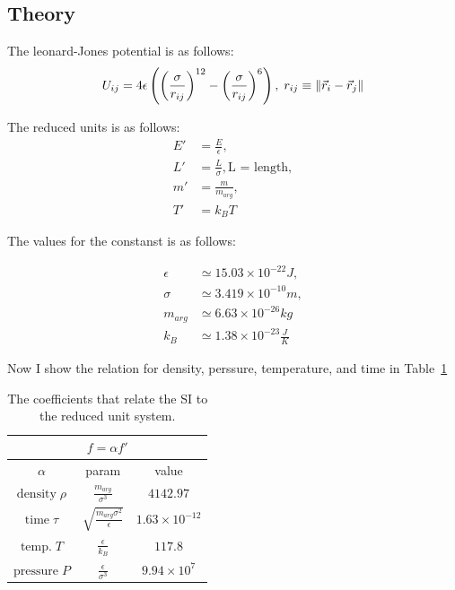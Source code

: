 \documentclass[12pt, a4paper]{article}
\begin{document}
	\subsection{Theory}
	The leonard-Jones potential is as follows:
		\begin{equation}
		U_{ij} = 4\epsilon \left(\left(\frac{\sigma}{r_{ij}}\right)^{12} - 
		\left(\frac{\sigma}{r_{ij}}\right)^6\right), \; 
		r_{ij} \equiv \norm{\vec{r}_i - \vec{r}_j}
		\label{eq:leonard_jones}
	\end{equation}
	
	The reduced units is as follows:
	\begin{equation}
		\begin{aligned}
			E' &= \frac{E}{\epsilon}, \\
			L' &= \frac{L}{\sigma}, \text{L = length},\\
			 m' &= \frac{m}{m_{arg}}, \\
			T' &= k_B T
		\end{aligned}
	\end{equation}

	\newpage
	The values for the constanst is as follows:
	
	\begin{equation}
		\begin{aligned}
			\epsilon &\simeq 15.03 \times 10^{-22} J,\\
			\sigma &\simeq 3.419 \times 10^{-10} m,\\
			m_{arg} &\simeq 6.63 \times 10^{-26} kg\\
			k_B &\simeq 1.38 \times 10^{-23} \frac{J}{K}
		\end{aligned}
	\end{equation}

	Now I show the relation for density, perssure, temperature, and time in Table~\ref{tab:reduced}
	
	\begin{table}[h!]
		\centering
		\begin{tabular}{|c|c|c|}
	\hline
\multicolumn{3}{|c|}{$f = \alpha f'$}\\
\hline
 $\alpha$ & param & value \\
 \hline
$\text{density} \;\rho$ & $\frac{m_{arg}}{\sigma^3}$ & $4142.97$\\
 \hline
 $\text{time}\; \tau$ & $\sqrt{\frac{m_{arg} \sigma^2}{\epsilon}}$ & $1.63 \times 10^{-12}$ \\
 \hline
$\text{temp.} \; T$ & $\frac{\epsilon}{k_B}$ & $117.8$\\
 \hline
 $\text{pressure}\; P$ & $\frac{\epsilon}{\sigma^3}$ & $9.94 \times 10^{7}$ \\	
 \hline
		\end{tabular}
	\caption{The coefficients that relate the SI to the reduced unit system. }
	\label{tab:reduced}
	\end{table}
	
\end{document}
